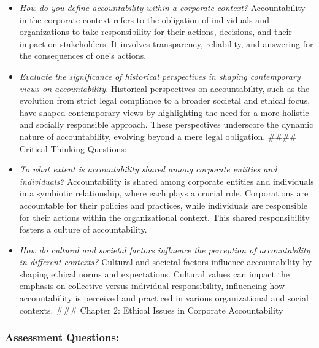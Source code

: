 \documentclass[
  letterpaper,
  DIV=11,
  numbers=noendperiod]{scrreprt}
\begin{document}
\begin{itemize}
\item
  \emph{How do you define accountability within a corporate context?}
  Accountability in the corporate context refers to the obligation of
  individuals and organizations to take responsibility for their
  actions, decisions, and their impact on stakeholders. It involves
  transparency, reliability, and answering for the consequences of one's
  actions.
\item
  \emph{Evaluate the significance of historical perspectives in shaping
  contemporary views on accountability.} Historical perspectives on
  accountability, such as the evolution from strict legal compliance to
  a broader societal and ethical focus, have shaped contemporary views
  by highlighting the need for a more holistic and socially responsible
  approach. These perspectives underscore the dynamic nature of
  accountability, evolving beyond a mere legal obligation. \#\#\#\#
  Critical Thinking Questions:
\item
  \emph{To what extent is accountability shared among corporate entities
  and individuals?} Accountability is shared among corporate entities
  and individuals in a symbiotic relationship, where each plays a
  crucial role. Corporations are accountable for their policies and
  practices, while individuals are responsible for their actions within
  the organizational context. This shared responsibility fosters a
  culture of accountability.
\item
  \emph{How do cultural and societal factors influence the perception of
  accountability in different contexts?} Cultural and societal factors
  influence accountability by shaping ethical norms and expectations.
  Cultural values can impact the emphasis on collective versus
  individual responsibility, influencing how accountability is perceived
  and practiced in various organizational and social contexts. \#\#\#
  Chapter 2: Ethical Issues in Corporate Accountability
\end{itemize}

\subsubsection{Assessment Questions:}\label{assessment-questions-9}
\end{document}
